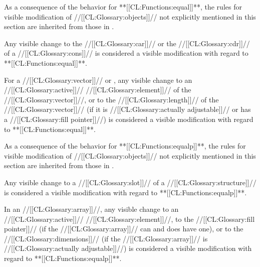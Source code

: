 As a consequence of the behavior for **[[CL:Functions:equal]]**, the rules for visible modification of //[[CL:Glossary:objects]]// not explicitly mentioned in this section are inherited from those in \secref\VisModEQL.

Any visible change to the //[[CL:Glossary:car]]// or the //[[CL:Glossary:cdr]]// of a //[[CL:Glossary:cons]]// is considered a visible modification with regard to **[[CL:Functions:equal]]**.
  \endsubsubsubsection%


For a //[[CL:Glossary:vector]]//  or , any visible change
     to an //[[CL:Glossary:active]]// //[[CL:Glossary:element]]// of the //[[CL:Glossary:vector]]//,
  or to the //[[CL:Glossary:length]]// of the //[[CL:Glossary:vector]]// (if it is //[[CL:Glossary:actually adjustable]]//  					           or has a //[[CL:Glossary:fill pointer]]//) is considered a visible modification with regard to **[[CL:Functions:equal]]**.
  \endsubsubsubsection%

\endsubsubsection%


As a consequence of the behavior for **[[CL:Functions:equalp]]**, the rules for visible modification of //[[CL:Glossary:objects]]// not explicitly mentioned in this section are inherited from those in \secref\VisModEQUAL.


Any visible change to a //[[CL:Glossary:slot]]// of a //[[CL:Glossary:structure]]// is considered a visible modification with regard to **[[CL:Functions:equalp]]**.
  \endsubsubsubsection%

In an //[[CL:Glossary:array]]//, any visible change
     to an //[[CL:Glossary:active]]// //[[CL:Glossary:element]]//,
     to the //[[CL:Glossary:fill pointer]]// (if the //[[CL:Glossary:array]]// can and does have one),
  or to the //[[CL:Glossary:dimensions]]// (if the //[[CL:Glossary:array]]// is //[[CL:Glossary:actually adjustable]]//) is considered a visible modification with regard to **[[CL:Functions:equalp]]**.

